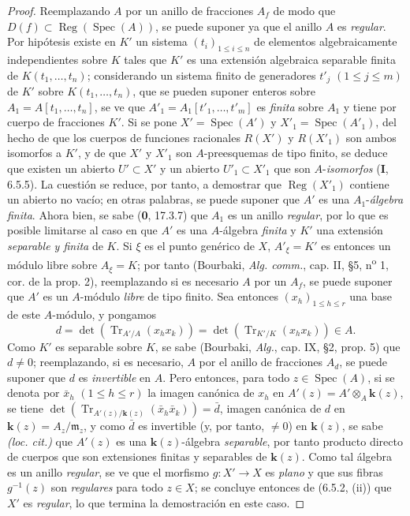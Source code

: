 \begin{proof}
Reemplazando $A$ por un anillo de fracciones $A_f$ de modo que
$D(f)\subset\operatorname{Reg}(\operatorname{Spec}(A))$, se puede suponer ya
que el anillo $A$ es \emph{regular}. Por hipótesis existe en $K'$ un sistema
$(t_i)_{1\leq i\leq n}$ de elementos algebraicamente independientes sobre
$K$ tales que $K'$ es una extensión algebraica separable finita de
$K(t_1,\ldots,t_n)$; considerando un sistema finito
de generadores $t'_j$ $(1\leq j\leq m)$ de $K'$ sobre
$K(t_1,\ldots,t_n)$, que se pueden suponer enteros sobre
$A_1=A[t_1,\ldots,t_n]$, se ve que
$A'_1=A_1[t'_1,\ldots,t'_m]$ es \emph{finita} sobre $A_1$ y tiene por cuerpo de
fracciones $K'$. Si se pone $X'=\operatorname{Spec}(A')$ y
$X'_1=\operatorname{Spec}(A'_1)$, del hecho de que los cuerpos de funciones
racionales $R(X')$ y $R(X'_1)$ son ambos isomorfos a $K'$, y de que $X'$
y $X'_1$ son $A$-preesquemas de tipo finito, se deduce que existen un
abierto $U'\subset X'$ y un abierto $U'_1\subset X'_1$ que son
$A$-\emph{isomorfos} (\textbf I, 6.5.5). La cuestión se reduce, por tanto, a demostrar que
$\operatorname{Reg}(X'_1)$ contiene un abierto no vacío; en otras palabras,
se puede suponer que $A'$ es una $A_1$-\emph{álgebra finita}. Ahora bien, se sabe
(\textbf 0, 17.3.7) que $A_1$ es un anillo \emph{regular}, por lo que es posible limitarse al
caso en que $A'$ es una $A$-álgebra \emph{finita} y $K'$ una extensión \emph{separable y
finita} de $K$. Si $\xi$ es el punto genérico de $X$, $A'_\xi=K'$ es
entonces un módulo libre sobre $A_\xi=K$; por tanto (Bourbaki,
\emph{Alg. comm.}, cap. II, \S5, n\textsuperscript{o} 1,
cor. de la prop. 2), reemplazando si es necesario $A$ por un $A_f$,
se puede suponer que $A'$ es un $A$-módulo \emph{libre} de tipo finito. Sea entonces
$(x_h)_{1\leq h\leq r}$ una base de este $A$-módulo, y pongamos
\[
d=\det(\operatorname{Tr}_{A'/A}(x_hx_k))=
\det(\operatorname{Tr}_{K'/K}(x_hx_k))\in A.
\]
Como $K'$ es separable sobre $K$, se sabe (Bourbaki, \emph{Alg.}, cap. IX, \S2,
prop. 5) que $d\neq0$; reemplazando, si es necesario, $A$ por el anillo de
fracciones $A_d$, se puede suponer que $d$ es \emph{invertible} en $A$. Pero entonces,
para todo $z\in\operatorname{Spec}(A)$, si se denota por $\bar x_h$
$(1\leq h\leq r)$ la imagen canónica de $x_h$ en
$A'(z)=A'\otimes_A \boldsymbol{k}(z)$, se tiene
$\det(\operatorname{Tr}_{A'(z)/\mathbf{k}(z)}(\bar x_h\bar x_k))=\bar d$, imagen
canónica de $d$ en $\boldsymbol{k}(z)=A_z/\mathfrak m_z$, y como $\bar d$ es invertible
(y, por tanto, $\neq0$) en $\boldsymbol{k}(z)$, se sabe \emph{(loc. cit.)} que $A'(z)$ es una
$\boldsymbol{k}(z)$-álgebra \emph{separable}, por tanto producto directo de cuerpos que son
extensiones finitas y separables de $\boldsymbol{k}(z)$. Como tal álgebra es un anillo
\emph{regular}, se ve que el morfismo $g:X'\to X$ es \emph{plano} y que sus fibras
$g^{-1}(z)$ son \emph{regulares} para todo $z\in X$; se concluye entonces de
(6.5.2, (ii)) que $X'$ es \emph{regular}, lo que termina la demostración en este
caso.
\end{proof}

